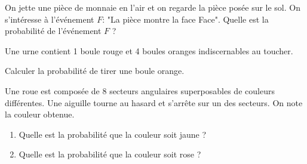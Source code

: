 %
%
%
%
\begin{pageParcoursu} 





 

On jette une pièce de monnaie en l'air et on regarde la pièce posée sur le sol. On s'intéresse à l'événement $F$: "La pièce montre la face Face". Quelle est la probabilité de l'événement $F$ ?

 




Une urne contient 1 boule rouge et 4 boules oranges indiscernables au toucher. 

Calculer la probabilité de tirer une boule orange. 

 





 
\begin{minipage}{.68\linewidth}
Une roue est composée de 8 secteurs angulaires superposables de couleurs différentes. Une aiguille tourne au hasard et s'arrête sur un des secteurs. On note la couleur obtenue.

\begin{enumerate}
\item Quelle est la probabilité que la couleur soit jaune ? 
\item Quelle est la probabilité que la couleur soit rose ?
\end{enumerate}
\end{minipage}
\hfill
\begin{minipage}{.28\linewidth}



\end{minipage}
\end{pageParcoursu}
